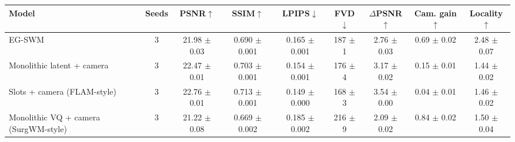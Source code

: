 \begin{tabular}{lcccccccc}
\toprule
Model & Seeds & PSNR$\uparrow$ & SSIM$\uparrow$ & LPIPS$\downarrow$ & FVD$\downarrow$ & $\Delta$PSNR$\uparrow$ & Cam. gain$\uparrow$ & Locality$\uparrow$ \\
\midrule
EG-SWM & 3 & 21.98 $\pm$ 0.03 & 0.690 $\pm$ 0.001 & 0.165 $\pm$ 0.001 & 187 $\pm$ 1 & 2.76 $\pm$ 0.03 & 0.69 $\pm$ 0.02 & 2.48 $\pm$ 0.07 \\
Monolithic latent + camera & 3 & 22.47 $\pm$ 0.01 & 0.703 $\pm$ 0.001 & 0.154 $\pm$ 0.001 & 176 $\pm$ 4 & 3.17 $\pm$ 0.02 & 0.15 $\pm$ 0.01 & 1.44 $\pm$ 0.02 \\
Slots + camera (FLAM-style) & 3 & 22.76 $\pm$ 0.01 & 0.713 $\pm$ 0.001 & 0.149 $\pm$ 0.000 & 168 $\pm$ 3 & 3.54 $\pm$ 0.00 & 0.04 $\pm$ 0.01 & 1.46 $\pm$ 0.02 \\
Monolithic VQ + camera (SurgWM-style) & 3 & 21.22 $\pm$ 0.08 & 0.669 $\pm$ 0.002 & 0.185 $\pm$ 0.002 & 216 $\pm$ 9 & 2.09 $\pm$ 0.02 & 0.84 $\pm$ 0.02 & 1.50 $\pm$ 0.04 \\
\bottomrule
\end{tabular}
